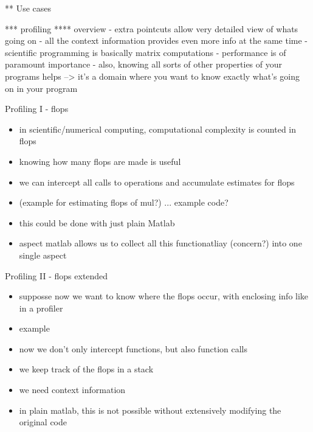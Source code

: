 ** Use cases

*** profiling
**** overview
     - extra pointcuts allow very detailed view of whats going on
     - all the context information provides even more info
       at the same time
     - scientific programming is basically matrix computations
     - performance is of paramount importance
     - also, knowing all sorts of other properties of your programs helps
       --> it's a domain where you want to know exactly what's going on in your program
\begin{frame}{Profiling I - flops}
  \begin{itemize}
  \item in scientific/numerical computing, computational complexity is
  counted in flops
  \item knowing how many flops are made is useful
  \item we can intercept all calls to operations and accumulate
  estimates for flops
  \item (example for estimating flops of mul?) ... example code?
  \item this could be done with just plain Matlab
  \item aspect matlab allows us to collect all this functionatliay
  (concern?) into one single aspect
  \end{itemize}
\end{frame}

\begin{frame}{Profiling II - flops extended}
  \begin{itemize}
  \item supposse now we want to know where the flops occur, with
  enclosing info like in a profiler
  \item example
  \item now we don't only intercept functions, but also function calls
  \item we keep track of the flops in a stack
  \item we need context information
  \item in plain matlab, this is not possible without extensively
  modifying the original code
  \end{itemize}
\end{frame}

